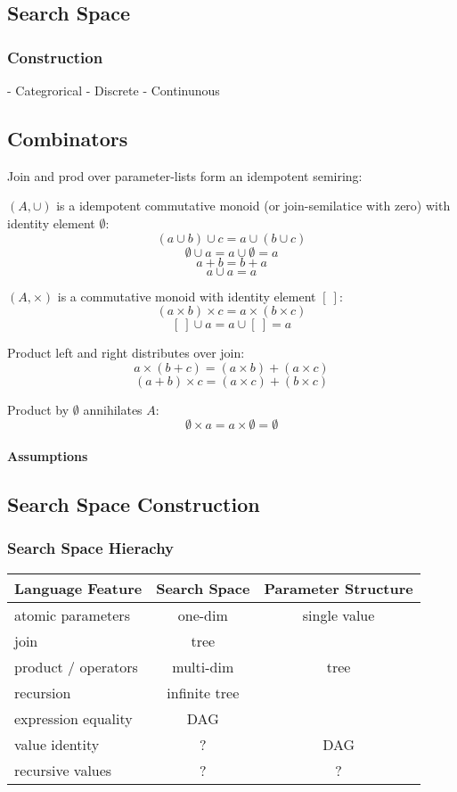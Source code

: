 \documentclass[english]{article}
\begin{document}
\begin{definition}[Topology]
\subsection{Search Space}
\subsubsection{Construction}
 - Categrorical
 - Discrete
 - Continunous

\subsection{Combinators}
Join and prod over parameter-lists form an idempotent semiring:

$(A, \cup)$ is a idempotent commutative monoid (or join-semilatice with zero) with identity element $\emptyset$:
$$(a \cup b) \cup c = a \cup (b \cup c)$$
$$\emptyset \cup a = a \cup \emptyset = a$$
$$a + b = b + a$$
$$a \cup a = a$$

$(A, \times)$ is a commutative monoid with identity element $[\ ]$:
$$(a \times b) \times c = a \times (b \times c)$$
$$[\ ] \cup a = a \cup [\ ] = a$$

Product left and right distributes over join:
$$a\times(b + c) = (a\times b) + (a\times c)$$
$$(a + b)\times c = (a\times c) + (b\times c)$$

Product by $\emptyset$ annihilates $A$:
$$\emptyset \times a = a \times \emptyset = \emptyset$$

\paragraph{Assumptions}
\subsection{Search Space Construction}
\subsubsection{Search Space Hierachy}


\begin{tabular}{ l | c | c }
Language Feature & Search Space & Parameter Structure \\
\hline
atomic parameters   & one-dim          & single value \\
join                & tree             &              \\
product / operators & multi-dim        & tree         \\
recursion           & infinite tree    &              \\
expression equality & DAG              &              \\
value identity      & ?                & DAG          \\
recursive values    & ?                & ?
\end{tabular}


\end{definition}
\end{document}
